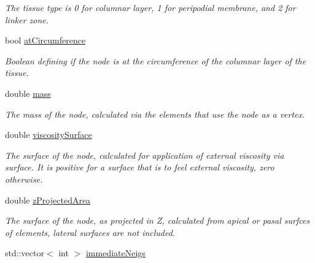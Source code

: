 \begin{DoxyCompactItemize}
\begin{DoxyCompactList}\small\item\em The tissue type is 0 for columnar layer, 1 for peripodial membrane, and 2 for linker zone. \end{DoxyCompactList}\item 
\hypertarget{classNode_ab6b225354ad961f2e9bd5d7fe9b67b3a}{}bool \hyperlink{classNode_ab6b225354ad961f2e9bd5d7fe9b67b3a}{at\+Circumference}\label{classNode_ab6b225354ad961f2e9bd5d7fe9b67b3a}

\begin{DoxyCompactList}\small\item\em Boolean defining if the node is at the circumference of the columnar layer of the tissue. \end{DoxyCompactList}\item 
\hypertarget{classNode_a63e510fc9158eb15e751861bc14eae38}{}double \hyperlink{classNode_a63e510fc9158eb15e751861bc14eae38}{mass}\label{classNode_a63e510fc9158eb15e751861bc14eae38}

\begin{DoxyCompactList}\small\item\em The mass of the node, calculated via the elements that use the node as a vertex. \end{DoxyCompactList}\item 
\hypertarget{classNode_a7a585da74654d80d5f94805e39c1e2ad}{}double \hyperlink{classNode_a7a585da74654d80d5f94805e39c1e2ad}{viscosity\+Surface}\label{classNode_a7a585da74654d80d5f94805e39c1e2ad}

\begin{DoxyCompactList}\small\item\em The surface of the node, calculated for application of external viscosity via surface. It is positive for a surface that is to feel external viscosity, zero otherwise. \end{DoxyCompactList}\item 
\hypertarget{classNode_af8e9678dfeffc9e99d925a83b58fde3d}{}double \hyperlink{classNode_af8e9678dfeffc9e99d925a83b58fde3d}{z\+Projected\+Area}\label{classNode_af8e9678dfeffc9e99d925a83b58fde3d}

\begin{DoxyCompactList}\small\item\em The surface of the node, as projected in Z, calculated from apical or pasal surfces of elements, lateral surfaces are not included. \end{DoxyCompactList}\item 
\hypertarget{classNode_adac7d84db546cadec7a8193e6ff52bd6}{}std\+::vector$<$ int $>$ \hyperlink{classNode_adac7d84db546cadec7a8193e6ff52bd6}{immediate\+Neigs}\label{classNode_adac7d84db546cadec7a8193e6ff52bd6}


\end{DoxyCompactItemize}
